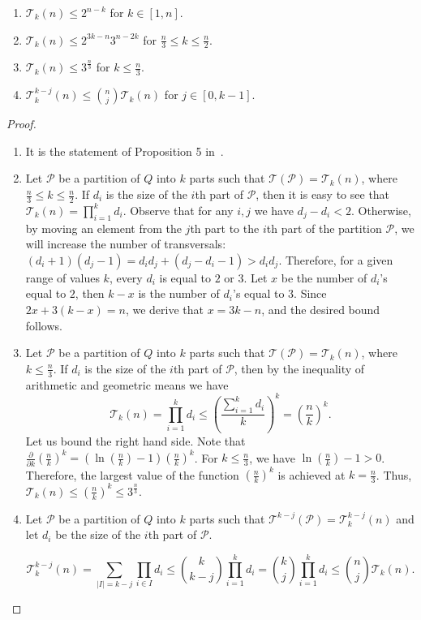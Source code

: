 \documentclass[a4paper,USenglish]{lipics}
\theoremstyle{definition}
\begin{document}
\begin{lemma}
\label{lemma:trans}
\begin{enumerate}
\item $\mathscr{T}_k(n) \leq 2^{n-k}$ for $k \in [1,n]$.
\item $\mathscr{T}_k(n) \leq 2^{3k-n}3^{n-2k}$ for $\frac{n}{3} \leq k \leq \frac{n}{2}$.
\item $\mathscr{T}_k(n) \leq 3^{\frac{n}{3}}$ for $k \leq \frac{n}{3}$.
\item $\mathscr{T}_k^{k-j}(n) \leq {n\choose j} \mathscr{T}_k (n)$ for $j \in [0,k-1]$.
\end{enumerate}
\end{lemma}
\begin{proof}
\begin{enumerate}
\item It is the statement of Proposition 5 in~\cite{Ivan2009}.
\item Let $\mathscr{P}$ be a partition of $Q$ into $k$ parts such that $\mathscr{T} (\mathscr{P}) = \mathscr{T}_k(n)$, where $\tfrac{n}{3} \leq k \leq \tfrac{n}{2}$. If $d_i$ is the size of the $i$th part of $\mathscr{P}$, then it is easy to see that $\mathscr{T}_k(n) = \prod_{i=1}^{k}d_i$. Observe that for any $i,j$ we have $d_j - d_i < 2$. Otherwise, by moving an element from the $j$th part to the $i$th part of the partition $\mathscr{P}$, we will increase the number of transversals: $(d_i + 1)(d_j - 1) = d_id_j + (d_j - d_i -1) > d_id_j$. Therefore, for a given range of values $k$, every $d_i$ is equal to $2$ or $3$. Let $x$ be the number of $d_i$'s equal to $2$, then $k-x$ is the number of $d_i$'s equal to $3$. Since $2x + 3(k - x) = n$, we derive that $x = 3k-n$, and the desired bound follows.
\item Let $\mathscr{P}$ be a partition of $Q$ into $k$ parts such that $\mathscr{T} (\mathscr{P}) = \mathscr{T}_k(n)$, where $ k \leq \tfrac{n}{3}$. If $d_i$ is the size of the $i$th part of $\mathscr{P}$, then by the inequality of arithmetic and geometric means we have $$\mathscr{T}_k(n) = \prod_{i=1}^{k}d_i \leq \left(\frac{\sum_{i=1}^{k} d_i}{k}\right)^k=\left(\frac{n}{k}\right)^k.$$ Let us bound the right hand side. Note that $\tfrac{\partial}{\partial k}(\tfrac{n}{k})^k = (\ln(\tfrac{n}{k}) - 1)(\tfrac{n}{k})^k$. For $k \leq \tfrac{n}{3}$, we have $\ln(\tfrac{n}{k}) - 1 > 0$. Therefore, the largest value of the function $(\tfrac{n}{k})^k$ is achieved at $k=\tfrac{n}{3}$.
Thus, $\mathscr{T}_k(n) \leq (\tfrac{n}{k})^k \leq 3^{\frac{n}{3}}$.
\item Let $\mathscr{P}$ be a partition of $Q$ into $k$ parts such that $\mathscr{T}^{k-j} (\mathscr{P}) = \mathscr{T}^{k-j}_k(n)$ and let $d_i$ be the size of the $i$th part of $\mathscr{P}$.

$$\mathscr{T}_k^{k-j}(n) = \sum_{|I|=k-j} \prod_{i \in I} d_i \leq {k \choose k-j} \prod_{i=1}^{k}d_i = {k \choose j} \prod_{i=1}^{k}d_i \leq {n \choose j} \mathscr{T}_k(n).$$
\end{enumerate}
\end{proof}
\end{document}
